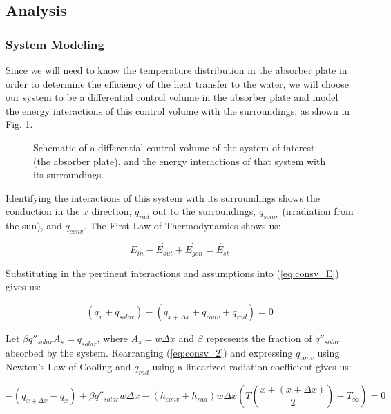 \documentclass[]{article}
\begin{document}
\subsection{Analysis}

\subsubsection{System Modeling}

Since we will need to know the temperature distribution in the absorber plate in order to determine the efficiency of the heat transfer to the water, we will choose our system to be a differential control volume in the absorber plate and model the energy interactions of this control volume with the surroundings, as shown in Fig. \ref{fig:model_schematic}.

\begin{figure}[h]
	\centering
	\caption{Schematic of a differential control volume of the system of interest (the absorber plate), and the energy interactions of that system with its surroundings.}
	\label{fig:model_schematic}
\end{figure}

Identifying the interactions of this system with its surroundings shows the conduction in the $x$ direction, $q_{rad}$ out to the surroundings, $q_{solar}$ (irradiation from the sun), and $q_{conv}$. The First Law of Thermodynamics shows us:

\begin{equation} \label{eq:consv_E}
	\dot{E_{in}} - \dot{E_{out}} + \dot{E_{gen}} = \dot{E_{st}}
\end{equation}

Substituting in the pertinent interactions and assumptions into (\ref{eq:consv_E}) gives us:

\begin{equation} \label{eq:consv_2}
	(q_x + q_{solar}) - (q_{x + \Delta x} + q_{conv} + q_{rad}) = 0
\end{equation}

Let $\beta q''_{solar} A_s = q_{solar}$, where $A_s = w\Delta x$ and $\beta$ represents the fraction of $q''_{solar}$ absorbed by the system. Rearranging (\ref{eq:consv_2}) and expressing $q_{conv}$ using Newton's Law of Cooling and $q_{rad}$ using a linearized radiation coefficient gives us:

\begin{equation} \label{eq:consv_3}
	-(q_{x + \Delta x} - q_x) + \beta q''_{solar} w\Delta x - (h_{conv} + h_{rad})w\Delta x(T(\frac{x + (x + \Delta x)}{2}) - T_{\infty}) = 0
\end{equation}
\end{document}
